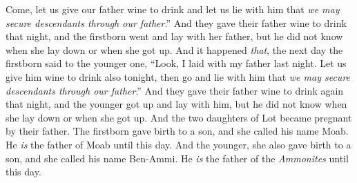 \begin{biblechapter}
\verse Come, let us give our father wine to drink and let us lie with him that \textit{we may secure descendants through our father}.”
\verse And they gave their father wine to drink that night, and the firstborn went and lay with her father, but he did not know when she lay down or when she got up.
\verse And it happened \textit{that}, the next day the firstborn said to the younger one, “Look, I laid with my father last night. Let us give him wine to drink also tonight, then go and lie with him that \textit{we may secure descendants through our father}.”
\verse And they gave their father wine to drink again that night, and the younger got up and lay with him, but he did not know when she lay down or when she got up.
\verse And the two daughters of Lot became pregnant by their father.
\verse The firstborn gave birth to a son, and she called his name Moab. He \textit{is} the father of Moab until this day.
\verse And the younger, she also gave birth to a son, and she called his name Ben-Ammi. He \textit{is} the father of the \textit{Ammonites} until this day.
\end{biblechapter}


